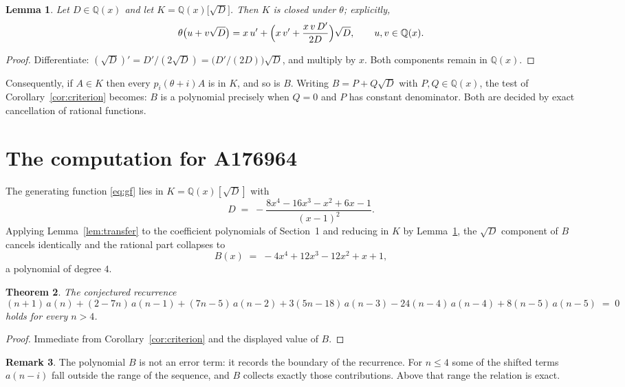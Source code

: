 \documentclass[11pt,a4paper]{article}
\theoremstyle{plain}
\newtheorem{theorem}{Theorem}
\newtheorem{lemma}[theorem]{Lemma}
\theoremstyle{definition}
\newtheorem{remark}[theorem]{Remark}
\begin{document}
\begin{lemma}\label{lem:field}
Let $D\in\mathbb{Q}(x)$ and let $K=\mathbb{Q}(x)\bigl[\sqrt{D}\bigr]$. Then $K$ is closed
under $\theta$; explicitly,
\[
\theta\bigl(u+v\sqrt{D}\bigr)=x\,u'+\Bigl(x\,v'+\frac{x\,v\,D'}{2D}\Bigr)\sqrt{D},
\qquad u,v\in\mathbb{Q}(x).
\]
\end{lemma}

\begin{proof}
Differentiate: $(\sqrt{D})'=D'/(2\sqrt{D})=\bigl(D'/(2D)\bigr)\sqrt{D}$, and multiply by
$x$. Both components remain in $\mathbb{Q}(x)$.
\end{proof}

Consequently, if $A\in K$ then every $p_{i}(\theta+i)A$ is in $K$, and so is $B$. Writing
$B=P+Q\sqrt{D}$ with $P,Q\in\mathbb{Q}(x)$, the test of Corollary~\ref{cor:criterion}
becomes: $B$ is a polynomial precisely when $Q=0$ and $P$ has constant denominator. Both
are decided by exact cancellation of rational functions.

\section{The computation for A176964}

The generating function \eqref{eq:gf} lies in $K=\mathbb{Q}(x)[\sqrt{D}]$ with
\[
D \;=\; - \frac{8 x^{4} - 16 x^{3} - x^{2} + 6 x - 1}{\left(x - 1\right)^{2}} .
\]
Applying Lemma~\ref{lem:transfer} to the coefficient polynomials of Section~1 and reducing
in $K$ by Lemma~\ref{lem:field}, the $\sqrt{D}$ component of $B$ cancels identically and
the rational part collapses to
\[
B(x)\;=\;- 4 x^{4} + 12 x^{3} - 12 x^{2} + x + 1 ,
\]
a polynomial of degree $4$.

\begin{theorem}
The conjectured recurrence
\[
(n + 1)\,a(n) + (2 - 7 n)\,a(n-1) + (7 n - 5)\,a(n-2) + 3 \left(5 n - 18\right)\,a(n-3) -  24 \left(n - 4\right)\,a(n-4) + 8 \left(n - 5\right)\,a(n-5) \;=\;0
\]
holds for every $n>4$.
\end{theorem}

\begin{proof}
Immediate from Corollary~\ref{cor:criterion} and the displayed value of $B$.
\end{proof}

\begin{remark}
The polynomial $B$ is not an error term: it records the boundary of the recurrence. For
$n\le4$ some of the shifted terms $a(n-i)$ fall outside the range of the sequence,
and $B$ collects exactly those contributions. Above that range the relation is exact.
\end{remark}
\end{document}
